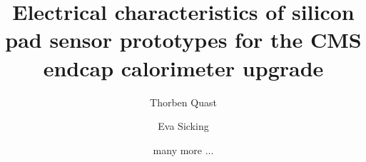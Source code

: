\documentclass[a4paper,11pt]{article}
\title{\boldmath Electrical characteristics of silicon pad sensor prototypes for the CMS endcap calorimeter upgrade}
\author[a]{Thorben Quast}
\author[a]{Eva Sicking}
\author[a]{many more ...}
\affiliation[a]{CERN EP-DT}
\begin{document}
\maketitle
\flushbottom

\linenumbers









\appendix




\end{document}

